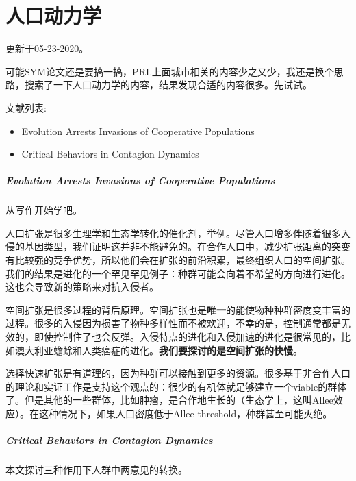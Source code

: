 \chapter{人口动力学}

更新于05-23-2020。

可能SYM论文还是要搞一搞，PRL上面城市相关的内容少之又少，我还是换个思路，搜索了一下人口动力学的内容，结果发现合适的内容很多。先试试。

文献列表:
\begin{itemize}
    \item Evolution Arrests Invasions of Cooperative Populations 
    \item Critical Behaviors in Contagion Dynamics
\end{itemize}

\paragraph{Evolution Arrests Invasions of Cooperative Populations}

从写作开始学吧。

人口扩张是很多生理学和生态学转化的催化剂，举例。尽管人口增多伴随着很多入侵的基因类型，我们证明这并非不能避免的。在合作人口中，减少扩张距离的突变有比较强的竞争优势，所以他们会在扩张的前沿积累，最终组织人口的空间扩张。我们的结果是进化的一个罕见罕见例子：种群可能会向着不希望的方向进行进化。这也会导致新的策略来对抗入侵者。

空间扩张是很多过程的背后原理。空间扩张也是\textbf{唯一}的能使物种种群密度变丰富的过程。很多的入侵因为损害了物种多样性而不被欢迎，不幸的是，控制通常都是无效的，即使控制住了也会反弹。入侵特点的进化和入侵加速的进化是很常见的，比如澳大利亚蟾蜍和人类癌症的进化。\textbf{我们要探讨的是空间扩张的快慢}。

选择快速扩张是有道理的，因为种群可以接触到更多的资源。很多基于非合作人口的理论和实证工作是支持这个观点的：很少的有机体就足够建立一个viable的群体了。但是其他的一些群体，比如肿瘤，是合作地生长的（生态学上，这叫Allee效应）。在这种情况下，如果人口密度低于Allee threshold，种群甚至可能灭绝。

\paragraph{Critical Behaviors in Contagion Dynamics}

本文探讨三种作用下人群中两意见的转换。